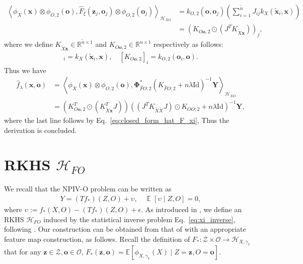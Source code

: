 \documentclass[11pt]{article}
\newcommand{\bx}{\mathbf x}
\newcommand{\bz}{\mathbf z}
\newcommand{\bo}{\mathbf o}
\newcommand{\calZ}{\mathcal{Z}}
\newcommand{\calH}{\mathcal{H}}
\newcommand{\calO}{\mathcal{O}}
\newcommand{\0}{\mathbf{0}}
\DeclareMathOperator{\E}{\mathbb{E}}
\newcommand{\steve}[1]{#1}
\newcommand{\bPhi}{\boldsymbol{\Phi}}
\begin{document}
\begin{appendix}
\begin{align*}
    \left\langle \phi_{X}(\bx)\otimes \phi_{O,2}(\bo), \hat{F}_{\xi}(\bz_j, \bo_j)\otimes \phi_{O,2}(\bo_j)\right\rangle_{\calH_{XO}} &= k_{O,2}(\bo, \bo_j) \left(\sum_{i=1}^{\tilde{n}}J_{ij}k_{X}(\tilde{\bx}_i, \bx)\right)\\
    &= \left(K_{O\bo,2}\odot (J^{T}K_{\tilde{X}\bx})\right)_j, 
\end{align*}
where we define $K_{\tilde{X}\bx} \in \mathbb{R}^{\tilde{n}\times 1}$ and $K_{O\bo,2}\in \mathbb{R}^{n\times 1}$ respectively as follows: 
\begin{align*}
[K_{\tilde{X}\bx}]_{i} = k_{X}(\tilde{\bx}_i, \bx),\quad [K_{O\bo, 2}]_{i} = k_{O,2}(\bo_i, \bo).     
\end{align*}
Thus we have
\begin{align*}
    \hat{f}_{\lambda}(\bx,\bo) 
    &= \left\langle \phi_{X}(\bx)\otimes \phi_{O,2}(\bo), \bPhi_{\hat{F}O;2}^{\ast}\left(K_{\hat{F}O;2} + n\lambda \mathrm{Id}\right)^{-1}\mathbf{Y}\right\rangle_{\calH_{XO}}\\
    &= \left(K_{O\bo, 2}^{T} \odot (K_{\tilde{X}\bx}^TJ)\right) \left(\left(J^{T}K_{\tilde{X}\tilde{X}}J\right)\odot K_{OO;2} + n\lambda \mathrm{Id}\right)^{-1}\mathbf{Y},
\end{align*}
where the last line follows by Eq.~\eqref{eq:closed_form_hat_F_xi}, 
Thus the derivation is concluded. 


\section{RKHS $\calH_{FO}$}\label{sec:defi_H_FO}
We recall that the NPIV-O problem can be written as 
\begin{align}
\label{eq:xi_inverse}
    Y = (Tf_\ast)(Z, O) + \upsilon, \quad \E[\upsilon \mid Z, O] = 0,
\end{align}
where $\upsilon:= f_{\ast}(X,O) - (Tf_{\ast})(Z,O) + \epsilon$. \steve{As introduced in \citet[Appendix E.1.2]{meunier2024nonparametricinstrumentalregressionkernel}, we define an RKHS $\calH_{FO}$ induced by the statistical inverse problem Eq.~\eqref{eq:xi_inverse}, following \citet[Theorem 4.21]{steinwart2008support}. Our construction can be obtained from that of \citet{meunier2024nonparametricinstrumentalregressionkernel} with an appropriate feature map construction, as follows. } Recall the definition of $F_{\ast}: \calZ\times \calO\to \calH_{X,\gamma_x}$ that for any $\bz\in \calZ, \bo\in \calO$, $F_{\ast}(\bz,\bo) = \mathbb{E}[\phi_{X,\gamma_x}(X)\mid Z = \bz, O = \bo]$.


\end{appendix}
\end{document}
